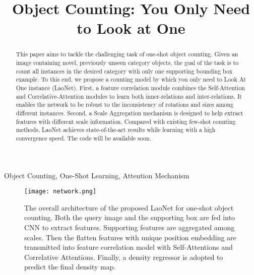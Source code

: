 \documentclass{article}
\newcommand\XP[1]{\textcolor{black}{#1}}\newcommand\XPC[1]{\textcolor{black}{[#1]}}
\begin{document}
\sloppy





\title{Object Counting: You Only Need to Look at One}
\address{\small School of Cyber Science and Engineering, Xi'an Jiaotong University, China\\
\small Emails: {linhuixjtu@gmail.com;  hongxiaopeng@ieee.org; iamwangyabin@stu.xjtu.edu.cn}}



\maketitle


\begin{abstract}

This paper aims to tackle the challenging task of one-shot object counting. Given an image containing novel, previously unseen category objects, the goal of the task is to count all instances in the desired category with only one supporting bounding box example. To this end, we propose a counting model by which you only need to Look At One instance (LaoNet). First, a feature correlation module combines the Self-Attention and Correlative-Attention modules to learn both inner-relations and inter-relations. It enables the network to be robust to the inconsistency of rotations and sizes among different instances. Second, a Scale Aggregation mechanism is designed to help extract features with different scale information. Compared with existing few-shot counting methods, LaoNet achieves state-of-the-art results while learning with a high convergence speed. The code will be available soon.





\end{abstract}
\begin{keywords}
Object Counting, One-Shot Learning, Attention Mechanism
\end{keywords}


\begin{figure*}[t]
    \centering
    \texttt{[image: network.png]}
    \caption{The overall architecture of the proposed LaoNet for one-shot object counting. Both the query image and the supporting box are fed into CNN to extract features. Supporting features are aggregated among scales. Then the flatten features with unique position embedding are transmitted into feature correlation model with Self-Attentions and Correlative Attentions. Finally, a density regressor is adopt\XP{ed} to predict the final density map. }
    \label{fig:network}
\end{figure*}
\end{document}
